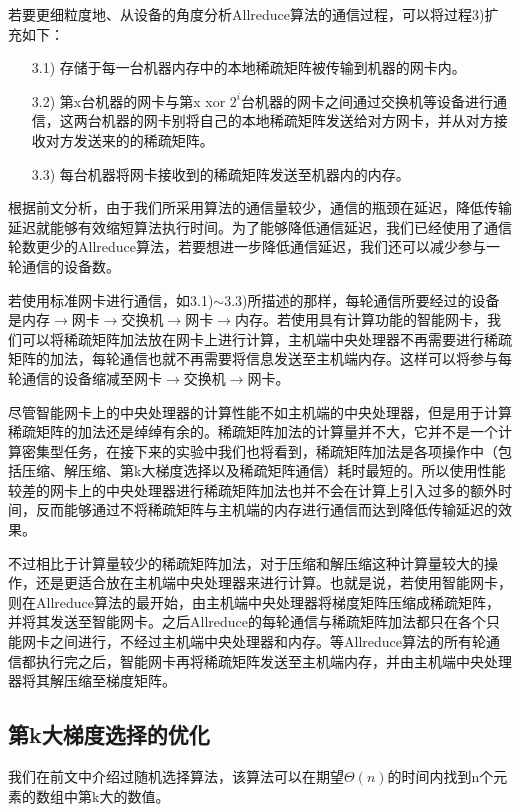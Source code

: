 若要更细粒度地、从设备的角度分析Allreduce算法的通信过程，可以将过程3)扩充如下：
\begin{itemize}
  \item [3.1)]
  存储于每一台机器内存中的本地稀疏矩阵被传输到机器的网卡内。
  \item [3.2)]
  第x台机器的网卡与第x xor $2^i$台机器的网卡之间通过交换机等设备进行通信，这两台机器的网卡别将自己的本地稀疏矩阵发送给对方网卡，并从对方接收对方发送来的的稀疏矩阵。
  \item [3.3)]
  每台机器将网卡接收到的稀疏矩阵发送至机器内的内存。
\end{itemize}

根据前文分析，由于我们所采用算法的通信量较少，通信的瓶颈在延迟，降低传输延迟就能够有效缩短算法执行时间。为了能够降低通信延迟，我们已经使用了通信轮数更少的Allreduce算法，若要想进一步降低通信延迟，我们还可以减少参与一轮通信的设备数。

若使用标准网卡进行通信，如3.1)$\sim$3.3)所描述的那样，每轮通信所要经过的设备是内存$\rightarrow$网卡$\rightarrow$交换机$\rightarrow$网卡$\rightarrow$内存。若使用具有计算功能的智能网卡，我们可以将稀疏矩阵加法放在网卡上进行计算，主机端中央处理器不再需要进行稀疏矩阵的加法，每轮通信也就不再需要将信息发送至主机端内存。这样可以将参与每轮通信的设备缩减至网卡$\rightarrow$交换机$\rightarrow$网卡。

尽管智能网卡上的中央处理器的计算性能不如主机端的中央处理器，但是用于计算稀疏矩阵的加法还是绰绰有余的。稀疏矩阵加法的计算量并不大，它并不是一个计算密集型任务，在接下来的实验中我们也将看到，稀疏矩阵加法是各项操作中（包括压缩、解压缩、第k大梯度选择以及稀疏矩阵通信）耗时最短的。所以使用性能较差的网卡上的中央处理器进行稀疏矩阵加法也并不会在计算上引入过多的额外时间，反而能够通过不将稀疏矩阵与主机端的内存进行通信而达到降低传输延迟的效果。

不过相比于计算量较少的稀疏矩阵加法，对于压缩和解压缩这种计算量较大的操作，还是更适合放在主机端中央处理器来进行计算。也就是说，若使用智能网卡，则在Allreduce算法的最开始，由主机端中央处理器将梯度矩阵压缩成稀疏矩阵，并将其发送至智能网卡。之后Allreduce的每轮通信与稀疏矩阵加法都只在各个只能网卡之间进行，不经过主机端中央处理器和内存。等Allreduce算法的所有轮通信都执行完之后，智能网卡再将稀疏矩阵发送至主机端内存，并由主机端中央处理器将其解压缩至梯度矩阵。

\subsection{第k大梯度选择的优化}
\label{subsec:topKOptimize}
我们在前文中介绍过随机选择算法，该算法可以在期望$\Theta(n)$的时间内找到n个元素的数组中第k大的数值。

